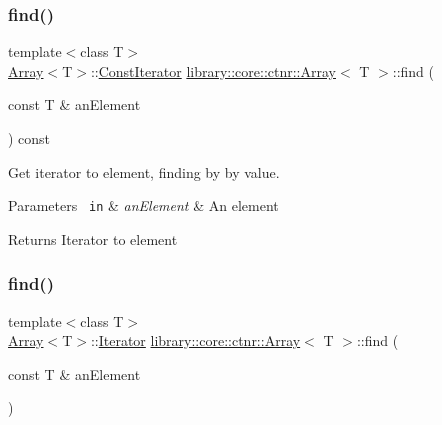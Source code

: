 \subsubsection{\texorpdfstring{find()}{find()}\hspace{0.1cm}{\footnotesize\ttfamily [1/2]}}
{\footnotesize\ttfamily template$<$class T$>$ \\
\mbox{\hyperlink{classlibrary_1_1core_1_1ctnr_1_1_array}{Array}}$<$T$>$\+::\mbox{\hyperlink{classlibrary_1_1core_1_1ctnr_1_1_array_ac26454f2a2ad4013873386a70aa25fc4}{Const\+Iterator}} \mbox{\hyperlink{classlibrary_1_1core_1_1ctnr_1_1_array}{library\+::core\+::ctnr\+::\+Array}}$<$ T $>$\+::find (\begin{DoxyParamCaption}\item[{const T \&}]{an\+Element }\end{DoxyParamCaption}) const}



Get iterator to element, finding by by value. 


\begin{DoxyCode}{0}
\end{DoxyCode}



\begin{DoxyParams}[1]{Parameters}
\mbox{\texttt{ in}}  & {\em an\+Element} & An element \\
\hline
\end{DoxyParams}
\begin{DoxyReturn}{Returns}
Iterator to element 
\end{DoxyReturn}
\mbox{\label{classlibrary_1_1core_1_1ctnr_1_1_array_afece85f642e3c623bac197e25ad2d4ec}} 
\subsubsection{\texorpdfstring{find()}{find()}\hspace{0.1cm}{\footnotesize\ttfamily [2/2]}}
{\footnotesize\ttfamily template$<$class T$>$ \\
\mbox{\hyperlink{classlibrary_1_1core_1_1ctnr_1_1_array}{Array}}$<$T$>$\+::\mbox{\hyperlink{classlibrary_1_1core_1_1ctnr_1_1_array_a2364a34e7bc76d3661c3d89c4729a0e4}{Iterator}} \mbox{\hyperlink{classlibrary_1_1core_1_1ctnr_1_1_array}{library\+::core\+::ctnr\+::\+Array}}$<$ T $>$\+::find (\begin{DoxyParamCaption}\item[{const T \&}]{an\+Element }\end{DoxyParamCaption})}



